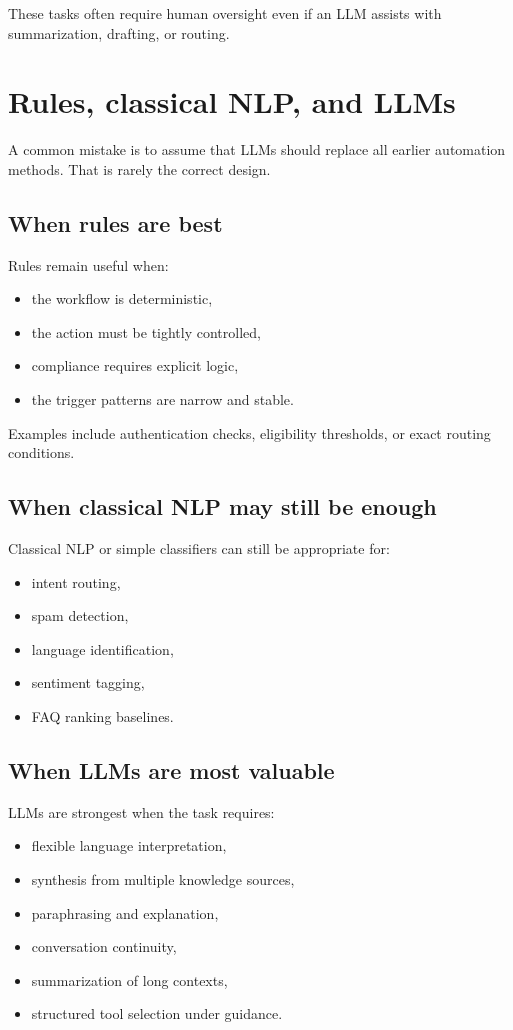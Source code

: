 These tasks often require human oversight even if an LLM assists with summarization, drafting, or routing.

\section{Rules, classical NLP, and LLMs}
A common mistake is to assume that LLMs should replace all earlier automation methods.
That is rarely the correct design.

\subsection{When rules are best}
Rules remain useful when:
\begin{itemize}
  \item the workflow is deterministic,
  \item the action must be tightly controlled,
  \item compliance requires explicit logic,
  \item the trigger patterns are narrow and stable.
\end{itemize}

Examples include authentication checks, eligibility thresholds, or exact routing conditions.

\subsection{When classical NLP may still be enough}
Classical NLP or simple classifiers can still be appropriate for:
\begin{itemize}
  \item intent routing,
  \item spam detection,
  \item language identification,
  \item sentiment tagging,
  \item FAQ ranking baselines.
\end{itemize}

\subsection{When LLMs are most valuable}
LLMs are strongest when the task requires:
\begin{itemize}
  \item flexible language interpretation,
  \item synthesis from multiple knowledge sources,
  \item paraphrasing and explanation,
  \item conversation continuity,
  \item summarization of long contexts,
  \item structured tool selection under guidance.
\end{itemize}

